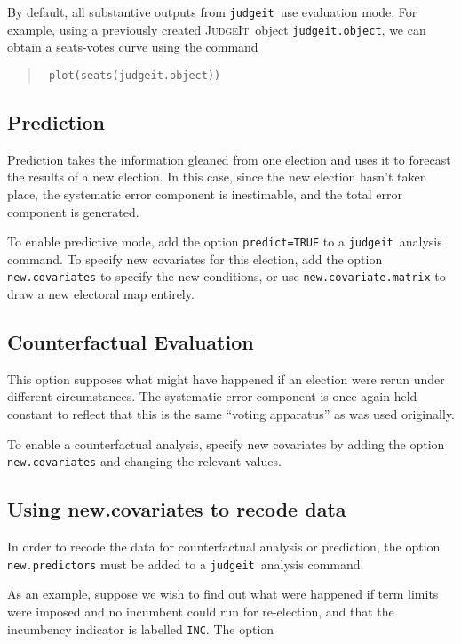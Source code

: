 \documentclass[oneside,letterpaper,titlepage]{article}
\newcommand{\JudgeIt}{\textsc{JudgeIt}\ }
\newcommand{\jud}{\texttt{judgeit}\ }
\begin{document}
By default, all substantive outputs from \jud use evaluation mode. For example, using a previously created \JudgeIt object \texttt{judgeit.object}, we can obtain a seats-votes curve using the command

\begin{quote} \texttt{
plot(seats(judgeit.object))}
\end{quote}

\subsection*{Prediction}

Prediction takes the information gleaned from one election and uses it to forecast the results of a new election. In this case, since the new election hasn't taken place, the systematic error component is inestimable, and the total error component is generated.

To enable predictive mode, add the option \texttt{predict=TRUE} to a \jud analysis command. To specify new covariates for this election, add the option \texttt{new.covariates} to specify the new conditions, or use \texttt{new.covariate.matrix} to draw a new electoral map entirely.

\subsection*{Counterfactual Evaluation}

This option supposes what might have happened if an election were rerun under different circumstances. The systematic error component is once again held constant to reflect that this is the same ``voting apparatus'' as was used originally.

To enable a counterfactual analysis, specify new covariates by adding the option \texttt{new.covariates} and changing the relevant values.

\subsection*{Using new.covariates to recode data}

In order to recode the data for counterfactual analysis or prediction, the option \texttt{new.predictors} must be added to a \jud analysis command.

As an example, suppose we wish to find out what were happened if term limits were imposed and no incumbent could run for re-election, and that the incumbency indicator is labelled \texttt{INC}. The option
\end{document}
